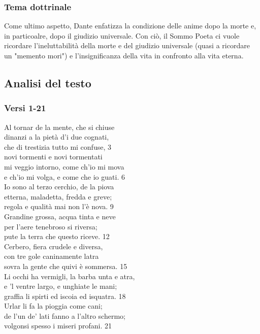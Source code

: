 \documentclass[10pt,a4paper]{article}
\begin{document}
	\subsubsection{Tema dottrinale}
	
	Come ultimo aspetto, Dante enfatizza la condizione delle anime dopo la morte e, in particoalre, dopo il giudizio universale. Con ciò, il Sommo Poeta ci vuole ricordare l'ineluttabilità della morte e del giudizio universale (quasi a ricordare un "memento mori") e l'insignificanza della vita in confronto alla vita eterna.
	
	\subsection{Analisi del testo}
	
	\subsubsection{Versi 1-21}
	
	\begin{estratto}
		Al tornar de la mente, che si chiuse\\
		dinanzi a la pietà d’i due cognati,\\
		che di trestizia tutto mi confuse,		3\\
		
		novi tormenti e novi tormentati\\
		mi veggio intorno, come ch’io mi mova\\
		e ch’io mi volga, e come che io guati.		6\\
		
		Io sono al terzo cerchio, de la piova\\
		etterna, maladetta, fredda e greve;\\
		regola e qualità mai non l’è nova.		9\\
		
		Grandine grossa, acqua tinta e neve\\
		per l’aere tenebroso si riversa;\\
		pute la terra che questo riceve.		12\\
		
		Cerbero, fiera crudele e diversa,\\
		con tre gole caninamente latra\\
		sovra la gente che quivi è sommersa.		15\\
		
		Li occhi ha vermigli, la barba unta e atra,\\
		e ’l ventre largo, e unghiate le mani;\\
		graffia li spirti ed iscoia ed isquatra.		18\\
		
		Urlar li fa la pioggia come cani;\\
		de l’un de’ lati fanno a l’altro schermo;\\
		volgonsi spesso i miseri profani.		21\\
	\end{estratto}
	
\end{document}
